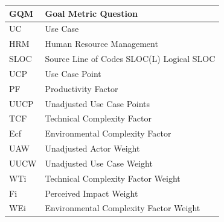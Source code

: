 \documentclass[11pt]{article}
\begin{document}
\begin{table}[htb]
    \centering
    \begin{tabular}{|p{2cm}|p{7.5cm}|} \hline 
         GQM & Goal Metric Question \\ \hline
         UC & Use Case \\ \hline
         HRM & Human Resource Management \\ \hline
         SLOC & Source Line of Codes SLOC(L) Logical SLOC \\ \hline
         UCP & Use Case Point \\ \hline
         PF & Productivity Factor \\ \hline
         UUCP & Unadjusted Use Case Points \\ \hline
         TCF & Technical Complexity Factor \\ \hline
         Ecf & Environmental Complexity Factor \\ \hline
         UAW & Unadjusted Actor Weight \\ \hline
         UUCW & Unadjusted Use Case Weight \\ \hline
         WTi & Technical Complexity Factor Weight \\ \hline
         Fi & Perceived Impact Weight \\ \hline
         WEi & Environmental Complexity Factor Weight \\ \hline
    \end{tabular}
    \label{tab:my_label}
\end{table}
\end{document}
